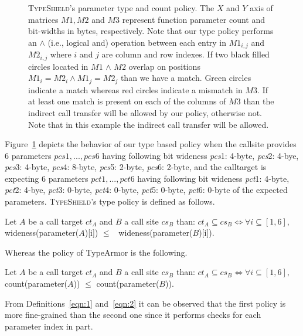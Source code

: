 \begin{figure}[H]
{\begin{tikzpicture}[shorten >=1pt,node distance=2cm,on grid,auto]
\end{tikzpicture}}
\caption{\textsc{TypeShield}'s parameter type and count policy. 
The $X$ and $Y$ axis of matrices $M1, M2$ and $M3$ represent function parameter count 
and bit-widths in bytes, respectively.
Note that our type policy performs an $\wedge$ (i.e., logical and) operation
between each entry in $M1_{i,j}$ and $M2_{i,j}$ where $i$ and $j$ are column and row indexes. 
If two black filled circles located in $M1$ $\wedge$ $M2$ overlap on positions $M1_{i} = M2_{i} \wedge M1_{j} = M2_{j}$ than we have a match.
Green circles indicate a match whereas red circles indicate a mismatch in $M3$.
If at least one match is present on each of the columns of 
$M3$ than the indirect call transfer will be allowed by our policy, 
otherwise not. Note that in this example
the indirect call transfer will be allowed.}
\label{Type and parameter count policy.}
\end{figure}

Figure~\ref{Type and parameter count policy.} depicts the behavior of our type based policy
when the callsite provides 6 parameters $pcs1, ..., pcs6$ having following bit 
wideness \textit{pcs}1: 4-byte, \textit{pcs}2: 4-bye, \textit{pcs}3: 4-byte, \textit{pcs}4: 8-byte, \textit{pcs}5: 2-byte, 
\textit{pcs}6: 2-byte, and the calltarget is expecting 6 parameters $pct1, ..., pct6$ having following bit 
wideness \textit{pct}1: 4-byte, \textit{pct}2: 4-bye, \textit{pct}3: 0-byte, \textit{pct}4: 0-byte, \textit{pct}5: 0-byte, 
\textit{pct}6: 0-byte of the expected parameters. 
\textsc{TypeShield}'s type policy is defined as follows. 

\begin{definition}
\label{eqn:1}
Let $A$ be a call target $ct_{A}$ and $B$ a call site $cs_{B}$ than: 
$ct_{A} \subseteq cs_{B} \iff \forall i \subseteq [1, 6],$
wideness(parameter($A$)[i]) $\leq$ \ wideness(parameter($B$)[i]).
\end{definition}

Whereas the policy of TypeArmor is the following. 
\begin{definition}
\label{eqn:2}
Let $A$ be a call target $ct_{A}$ and $B$ a call site $cs_{B}$ than: 
$ct_{A} \subseteq cs_{B} \iff \forall i \subseteq [1, 6],$ 
count(parameter($A$)) $\leq$ count(parameter($B$)).
\end{definition}

From Definitions~\eqref{eqn:1} and~\eqref{eqn:2} it can be observed that 
the first policy is more fine-grained than the second one since it performs checks 
for each parameter index in part.

